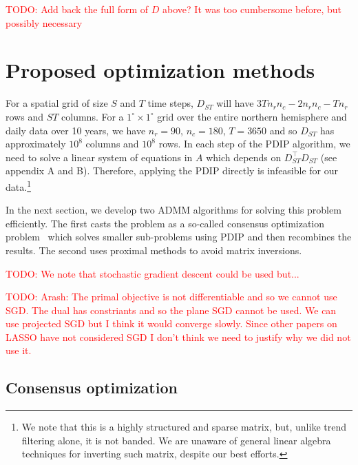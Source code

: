 \documentclass{article}
\newcommand{\attn}[1]{\textcolor{red}{TODO: #1}}
\begin{document}
\attn{Add back the full form of $D$ above? It was too cumbersome
  before, but possibly necessary}

\section{Proposed optimization methods}
\label{sec:prop-optim-meth}

For a spatial grid of size $S$ and $T$ time steps, $D_{ST}$ will have $3Tn_rn_c-2n_rn_c-Tn_r$ rows and $ST$ columns. For a $1^\circ\times 1^\circ$ grid over the entire northern hemisphere and daily data over 10 years, we have $n_r=90$, $n_c=180$, $T=3650$ and so $D_{ST}$ has approximately $10^8$ columns and $10^8$ rows. In each step of the PDIP algorithm, we need to solve a linear system of equations in $A$ which depends on $D_{ST}^\top D_{ST}$ (see appendix A and B). Therefore, applying the PDIP directly is infeasible for our data.\footnote{We note that this is a highly structured and sparse matrix, but, unlike trend filtering alone, it is not banded. We are unaware of general linear algebra techniques for inverting such matrix, despite our best efforts.} 

In the next section, we develop two ADMM algorithms for solving this
problem efficiently. The first casts the problem as a
so-called consensus optimization problem~\citep{boyd_distributed_2011}
which solves smaller sub-problems using PDIP and then recombines the results. The
second uses proximal methods to avoid matrix inversions.
 
\attn{We note that stochastic gradient descent could be used but...}

\attn{Arash: The primal objective is not differentiable and so we cannot use SGD. The dual has constriants and so the plane SGD cannot be used. We can use projected SGD but I think it would converge slowly. Since other papers on LASSO have not considered SGD I don't think we need to justify why we did not use it.}


\subsection{Consensus optimization}
\label{sec:consOpt}
\end{document}
